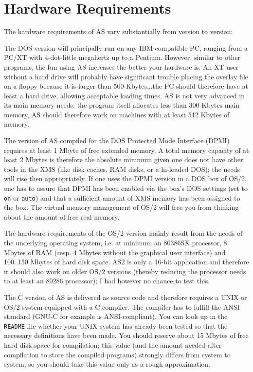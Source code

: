\documentclass[12pt,twoside]{report}
\newcommand{\tty}[1]{{\tt #1}}
\begin{document}
      
\section{Hardware Requirements}

The hardware requirements of AS vary substantially from version to
version:

The DOS version  will principally run on any
IBM-compatible PC, ranging from a PC/XT with 4-dot-little megahertz up to
a Pentium.  However, similar to other programs, the fun using AS increases
the better your hardware is.  An XT user without a hard drive will
probably have significant trouble placing the overlay file on a floppy
because it is larger than 500 Kbytes...the PC should therefore have at
least a hard drive, allowing acceptable loading times.  AS is not very
advanced in its main memory needs: the program itself allocates less than
300 Kbytes main memory, AS should therefore work on machines with at least
512 Kbytes of memory.

The version of AS  compiled for the DOS Protected
Mode Interface (DPMI) requires at least 1 Mbyte of free extended memory. 
A total memory capacity of at least 2 Mbytes is therefore the absolute
minimum given one does not have other tools in the XMS (like disk caches,
RAM disks, or a hi-loaded DOS); the needs will rise then appropriately. 
If one uses the DPMI version in a DOS box of OS/2, one has to assure that
DPMI has been enabled via the box's DOS settings (set to \tty{on} or
\tty{auto}) and that a sufficient amount of XMS memory has been assigned
to the box.  The virtual memory management of OS/2 will free you
from thinking about the amount of free real memory.

The hardware requirements of the OS/2  version
mainly result from the needs of the underlying operating system, i.e. at
minimum an 80386SX processor, 8 Mbytes of RAM (resp. 4 Mbytes without the
graphical user interface) and 100..150 Mbytes of hard disk space.  AS2 is
only a 16-bit application and therefore it should also work on older OS/2
versions (thereby reducing the processor needs to at least an 80286
processor); I had however no chance to test this.

The C version of AS  is delivered as source code and
therefore requires a UNIX or OS/2 system equipped with a C compiler.  The
compiler has to fulfill the ANSI standard (GNU-C for example is
ANSI-compliant).  You can look up in the \tty{README} file whether your
UNIX system has already been tested so that the necessary definitions have
been made.  You should reserve about 15 Mbytes of free hard disk space for
compilation; this value (and the amount needed after compilation to store
the compiled programs) strongly differs from system to system, so you
should take this value only as a rough approximation.
\end{document}
